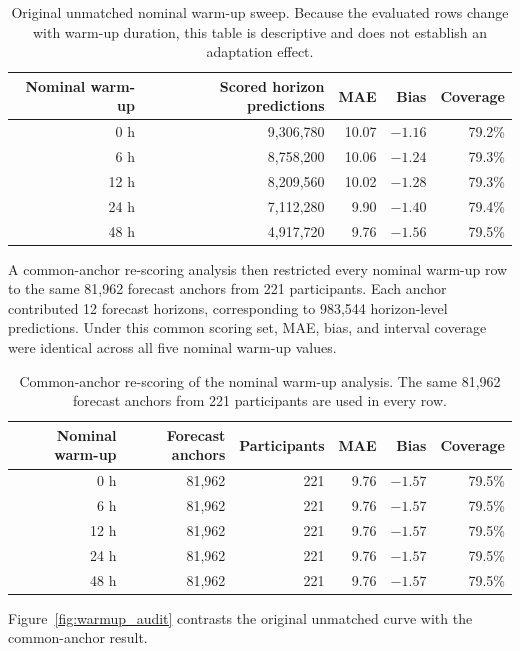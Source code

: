 \begin{table}[H]
\centering
\caption{Original unmatched nominal warm-up sweep. Because the evaluated rows
change with warm-up duration, this table is descriptive and does not establish
an adaptation effect.}
\label{tab:unmatched_warmup}
\begin{tabular}{rrrrr}
\toprule
Nominal warm-up & Scored horizon predictions & MAE & Bias & Coverage \\
\midrule
0 h  & 9,306,780 & 10.07 & $-1.16$ & 79.2\% \\
6 h  & 8,758,200 & 10.06 & $-1.24$ & 79.3\% \\
12 h & 8,209,560 & 10.02 & $-1.28$ & 79.3\% \\
24 h & 7,112,280 & 9.90  & $-1.40$ & 79.4\% \\
48 h & 4,917,720 & 9.76  & $-1.56$ & 79.5\% \\
\bottomrule
\end{tabular}
\end{table}

A common-anchor re-scoring analysis then restricted every nominal warm-up row
to the same 81,962 forecast anchors from 221 participants. Each anchor
contributed 12 forecast horizons, corresponding to 983,544 horizon-level
predictions. Under this common scoring set, MAE, bias, and interval coverage
were identical across all five nominal warm-up values.

\begin{table}[H]
\centering
\caption{Common-anchor re-scoring of the nominal warm-up analysis. The same
81,962 forecast anchors from 221 participants are used in every row.}
\label{tab:matched_warmup}
\begin{tabular}{rrrrrr}
\toprule
Nominal warm-up & Forecast anchors & Participants & MAE & Bias & Coverage \\
\midrule
0 h  & 81,962 & 221 & 9.76 & $-1.57$ & 79.5\% \\
6 h  & 81,962 & 221 & 9.76 & $-1.57$ & 79.5\% \\
12 h & 81,962 & 221 & 9.76 & $-1.57$ & 79.5\% \\
24 h & 81,962 & 221 & 9.76 & $-1.57$ & 79.5\% \\
48 h & 81,962 & 221 & 9.76 & $-1.57$ & 79.5\% \\
\bottomrule
\end{tabular}
\end{table}

Figure~\ref{fig:warmup_audit} contrasts the original unmatched curve with the
common-anchor result.

